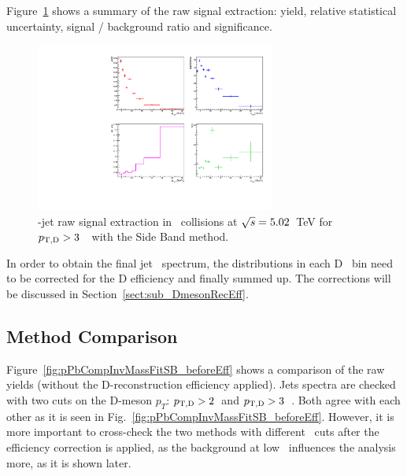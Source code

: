 Figure~\ref{fig:eq_pPb_RSU_raw_Dbins} shows a summary of the raw signal extraction:
yield, relative statistical uncertainty, signal / background ratio and significance.

\begin{figure}[bth]
\centering
\includegraphics[width=0.7\textwidth]{pPbplots/plotsSB_noEff_pt3_noDetails/signalParams_FASTwoSDD}
\caption{\Dstar-jet raw signal extraction in \pPb\ collisions at $\sqrt{s}=5.02$~TeV for $p_{\mathrm{T,D}}>3$~\GeVc\ with the Side Band method.}
\label{fig:eq_pPb_RSU_raw_Dbins}
\end{figure}

In order to obtain the final jet \pt\ spectrum, the distributions in each D \pt\ bin need to be corrected for the D efficiency and finally summed up.
The corrections will be discussed in Section~\ref{sect:sub_DmesonRecEff}. 

\subsection{Method Comparison}

Figure~\ref{fig:pPbCompInvMassFitSB_beforeEff} shows a comparison of the raw yields (without the D-reconstruction efficiency applied). Jets spectra are checked with two cuts on the D-meson $p_{T}$: $p_{\mathrm{T,D}}>2$~\GeVc and $p_{\mathrm{T,D}}>3$~\GeVc. Both agree with each other as it is seen in Fig.~\ref{fig:pPbCompInvMassFitSB_beforeEff}. However, it is more important to cross-check the two methods with different \ptd\ cuts after the efficiency correction is applied, as the background at low \ptd\ influences the analysis more, as it is shown later.

